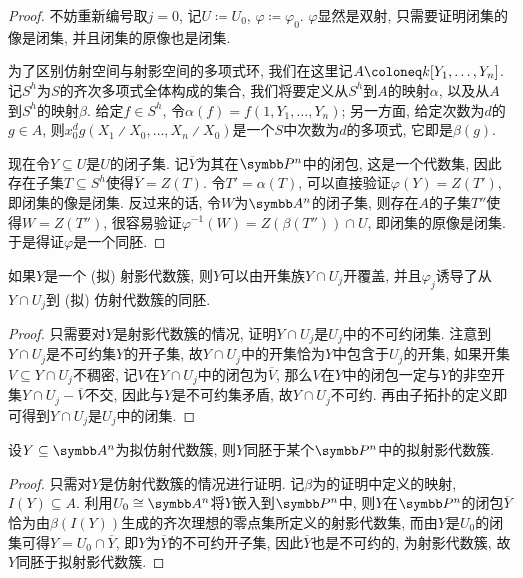 \begin{proof}
  不妨重新编号取$j=0$, 记$U\coloneq U_0$, $\varphi\coloneq \varphi_0$. $\varphi$显然是双射, 只需要证明闭集的像是闭集, 并且闭集的原像也是闭集.

  为了区别仿射空间与射影空间的多项式环, 我们在这里记$A\coloneq \kk [Y_1, \dotsc, Y_n]$. 记$S^h$为$S$的齐次多项式全体构成的集合, 我们将要定义从$S^h$到$A$的映射$\alpha$, 以及从$A$到$S^h$的映射$\beta$. 给定$f\in S^h$, 令$\alpha(f)=f(1, Y_1, \dotsc, Y_n)$; 另一方面, 给定次数为$d$的$g\in A$, 则$x_0^dg(X_1{\divslash}X_0, \dotsc, X_n{\divslash}X_0)$是一个$S$中次数为$d$的多项式, 它即是$\beta(g)$.

  现在令$Y\subseteq U$是$U$的闭子集. 记$\overline{Y}$为其在$\PP^n$中的闭包, 这是一个代数集, 因此存在子集$T\subseteq S^h$使得$\overline{Y}=Z(T)$. 令$T'=\alpha(T)$, 可以直接验证$\varphi(Y)=Z(T')$, 即闭集的像是闭集. 反过来的话, 令$W$为$\AF^n$的闭子集, 则存在$A$的子集$T''$使得$W=Z(T'')$, 很容易验证$\varphi^{-1}(W) = Z(\beta(T''))\cap U$, 即闭集的原像是闭集. 于是得证$\varphi$是一个同胚.
\end{proof}

\begin{proposition}\label{prop:projvarietyopencoverhomeo}
  如果$Y$是一个 (拟) 射影代数簇, 则$Y$可以由开集族$Y\cap U_j$开覆盖, 并且$\varphi_j$诱导了从$Y\cap U_j$到 (拟) 仿射代数簇的同胚.
\end{proposition}

\begin{proof}
  只需要对$Y$是射影代数簇的情况, 证明$Y\cap U_j$是$U_j$中的不可约闭集. 注意到$Y\cap U_j$是不可约集$Y$的开子集, 故$Y\cap U_j$中的开集恰为$Y$中包含于$U_j$的开集\parencite[89, Lemma 16.2]{munkres_topology_2000}, 如果开集$V\subseteq Y\cap U_j$不稠密, 记$V$在$Y\cap U_j$中的闭包为$\overline{V}$, 那么$V$在$Y$中的闭包一定与$Y$的非空开集$Y\cap U_j-\overline{V}$不交\parencite[95, Theorem 17.5]{munkres_topology_2000}, 因此与$Y$是不可约集矛盾, 故$Y\cap U_j$不可约. 再由子拓扑的定义即可得到$Y\cap U_j$是$U_j$中的闭集.
\end{proof}

\begin{proposition}
  设$Y\subseteq \AF^n$为拟仿射代数簇, 则$Y$同胚于某个$\PP^n$中的拟射影代数簇.
\end{proposition}

\begin{proof}
  只需对$Y$是仿射代数簇的情况进行证明. 记$\beta$为的证明中定义的映射, $I(Y)\subseteq A$. 利用$U_0\cong\AF^n$将$Y$嵌入到$\PP^n$中, 则$Y$在$\PP^n$的闭包$\overline{Y}$恰为由$\beta (I(Y))$生成的齐次理想的零点集所定义的射影代数集, 而由$Y$是$U_0$的闭集可得$Y=U_0\cap \overline{Y}$, 即$Y$为$\overline{Y}$的不可约开子集, 因此$\overline{Y}$也是不可约的, 为射影代数簇, 故$Y$同胚于拟射影代数簇.
\end{proof}

